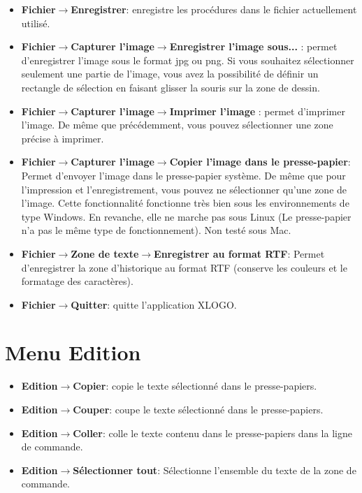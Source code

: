 \begin{itemize}
\begin{center}
\end{center}
\vspace{0.25cm}
\item \textbf{Fichier$\to$Enregistrer}: enregistre les procédures dans le fichier actuellement utilisé.\\
\item \textbf{Fichier$\to$Capturer l'image$\to$Enregistrer l'image sous...} : permet
d'enregistrer l'image sous le format jpg ou png. Si vous souhaitez
sélectionner seulement une partie de l'image, vous avez la possibilité
de définir un rectangle de sélection en faisant glisser la souris sur la zone de dessin.\\
\item \textbf{Fichier$\to$Capturer l'image$\to$Imprimer l'image} : permet d'imprimer
l'image. De même que précédemment, vous pouvez sélectionner
une zone précise à imprimer.\\
\item \textbf{Fichier$\to$Capturer l'image$\to$Copier l'image dans le presse-papier}: Permet d'envoyer l'image dans le presse-papier système. De même que pour l'impression et l'enregistrement, vous pouvez ne sélectionner qu'une zone de l'image. Cette fonctionnalité fonctionne très bien sous les environnements de type Windows. En revanche, elle ne marche pas sous Linux (Le presse-papier n'a pas le même type de fonctionnement). Non testé sous Mac.\\
\item \textbf{Fichier$\to$Zone de texte$\to$Enregistrer au format RTF}: Permet d'enregistrer la zone d'historique au format RTF (conserve les couleurs et le formatage des caractères).\\
\item \textbf{Fichier$\to$Quitter}: quitte l'application XLOGO.\\
\end{itemize}

\section{Menu \og Edition \fg}
\begin{itemize}
\item \textbf{Edition$\to$Copier}: copie le texte sélectionné dans le presse-papiers.\\
\item \textbf{Edition$\to$Couper}: coupe le texte sélectionné dans le presse-papiers.\\
\item \textbf{Edition$\to$Coller}: colle le texte contenu dans le presse-papiers dans
la ligne de commande.\\
\item \textbf{Edition$\to$Sélectionner tout}: Sélectionne l'ensemble du texte de la zone de commande.
\end{itemize}

